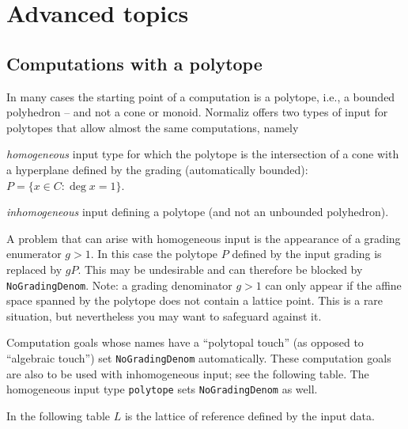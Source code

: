 
\section{Advanced topics}\label{MoreExamples}

\subsection{Computations with a polytope}\label{Polytopes}

In many cases the starting point of a computation is a polytope, i.e., a bounded polyhedron -- and not a cone or monoid. Normaliz offers two types of input for polytopes that allow almost the same computations, namely
\begin{arab}
	\item \emph{homogeneous} input type for which the polytope is the intersection of a cone with a hyperplane defined by the grading (automatically bounded): $P=\{x\in C:\deg x=1\}$.
	\item \emph{inhomogeneous} input defining a polytope (and not an unbounded polyhedron).
\end{arab}
A problem that can arise with homogeneous input is the appearance of a grading enumerator $g>1$. In this case the polytope $P$ defined by the input grading is replaced by $gP$. This may be undesirable and can therefore be blocked by \verb|NoGradingDenom|. Note: a grading denominator $g>1$ can only appear if the affine space spanned by the polytope does not contain a lattice point. This is a rare situation, but nevertheless you may want to safeguard against it.

Computation goals whose names have a ``polytopal touch'' (as opposed to ``algebraic touch'') set \verb|NoGradingDenom| automatically. These computation goals are also to be used with inhomogeneous input; see the following table. The homogeneous input type \verb|polytope| sets \verb|NoGradingDenom| as well.

In the following table $L$ is the lattice of reference defined by the input data.


